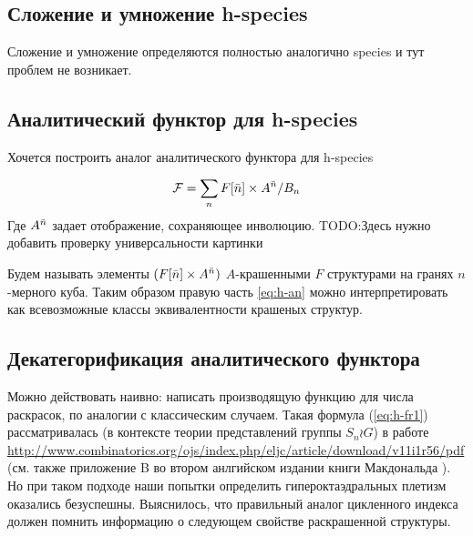 \subsection{Сложение и умножение h-species}
Сложение и умножение определяются полностью аналогично species и тут проблем не
возникает.


\subsection{Аналитический функтор для h-species}
Хочется построить аналог аналитического функтора для h-species


\begin{equation}
\label{eq:h-an}
	\mathcal F = \sum\limits_n F[\Bar n] \times A^{\Bar n} / B_n
\end{equation}
Где $A^{\Bar n}$ задает отображение, сохраняющее инволюцию. 
TODO:Здесь нужно добавить проверку универсальности картинки

\begin{definition}
Будем называть элементы $(F[\Bar n] \times
A^{\Bar n})$ $A$-крашенными $F$ структурами на гранях $n$-мерного куба. Таким
образом правую часть \ref{eq:h-an} можно интерпретировать как всевозможные
классы эквивалентности крашеных структур.
\end{definition}

\subsection{Декатегорификация аналитического функтора} 
Можно действовать наивно: написать производящую функцию для числа раскрасок, по
аналогии с классическим случаем. Такая формула (\ref{eq:h-fr1}) рассматривалась
(в контексте теории представлений группы $S_n \wr G$) в работе
\url{http://www.combinatorics.org/ojs/index.php/eljc/article/download/v11i1r56/pdf}
(см. также приложение B во втором анлгийском издании книги Макдональда
\cite{Mac2}). Но при таком подходе наши попытки определить гипероктаэдральных
плетизм оказались безуспешны. Выяснилось, что правильный аналог цикленного
индекса должен помнить информацию о следующем свойстве раскрашенной структуры.

